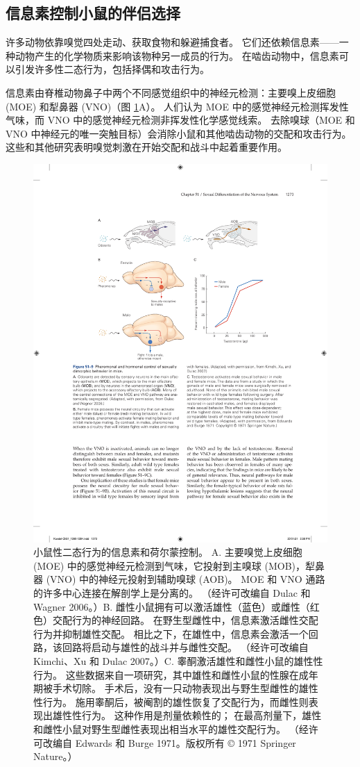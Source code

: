 \subsection{信息素控制小鼠的伴侣选择}
许多动物依靠嗅觉四处走动、获取食物和躲避捕食者。 它们还依赖信息素——一种动物产生的化学物质来影响该物种另一成员的行为。 在啮齿动物中，信息素可以引发许多性二态行为，包括择偶和攻击行为。

信息素由脊椎动物鼻子中两个不同感觉组织中的神经元检测：主要嗅上皮细胞 (MOE) 和犁鼻器 (VNO)（图 \ref{fig:51_9}A）。 人们认为 MOE 中的感觉神经元检测挥发性气味，而 VNO 中的感觉神经元检测非挥发性化学感觉线索。 去除嗅球（MOE 和 VNO 中神经元的唯一突触目标）会消除小鼠和其他啮齿动物的交配和攻击行为。 这些和其他研究表明嗅觉刺激在开始交配和战斗中起着重要作用。

\begin{figure}[htbp]
	\centering
	\includegraphics[width=0.8\linewidth]{chap51/fig_51_9}
	\caption{小鼠性二态行为的信息素和荷尔蒙控制。 A. 主要嗅觉上皮细胞 (MOE) 中的感觉神经元检测到气味，它投射到主嗅球 (MOB)，犁鼻器 (VNO) 中的神经元投射到辅助嗅球 (AOB)。 MOE 和 VNO 通路的许多中心连接在解剖学上是分离的。 （经许可改编自 Dulac 和 Wagner 2006。）B. 雌性小鼠拥有可以激活雄性（蓝色）或雌性（红色）交配行为的神经回路。 在野生型雌性中，信息素激活雌性交配行为并抑制雄性交配。 相比之下，在雄性中，信息素会激活一个回路，该回路将启动与雄性的战斗并与雌性交配。 （经许可改编自 Kimchi、Xu 和 Dulac 2007。）C. 睾酮激活雄性和雌性小鼠的雄性性行为。 这些数据来自一项研究，其中雄性和雌性小鼠的性腺在成年期被手术切除。 手术后，没有一只动物表现出与野生型雌性的雄性性行为。 施用睾酮后，被阉割的雄性恢复了交配行为，而雌性则表现出雄性性行为。 这种作用是剂量依赖性的； 在最高剂量下，雄性和雌性小鼠对野生型雌性表现出相当水平的雄性交配行为。 （经许可改编自 Edwards 和 Burge 1971。版权所有 © 1971 Springer Nature。）}
	\label{fig:51_9}
\end{figure}

